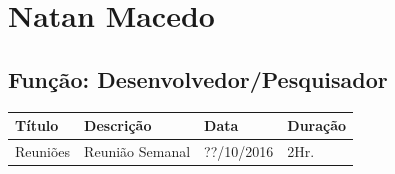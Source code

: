 \documentclass[a4paper, 12pt]{article}
\newcommand\datareuniao{??/10/2016}
\begin{document}


\section*{Natan Macedo}
\subsection*{Função: Desenvolvedor/Pesquisador}

\begin{tabularx}{\linewidth}{l|X|l|l} \toprule
	\bfseries Título & \bfseries Descrição & \bfseries Data & \bfseries Duração
	\\ \midrule
	Reuniões & Reunião Semanal & \datareuniao &  2Hr.
	\\ \midrule
\end{tabularx}
\clearpage
\end{document}
